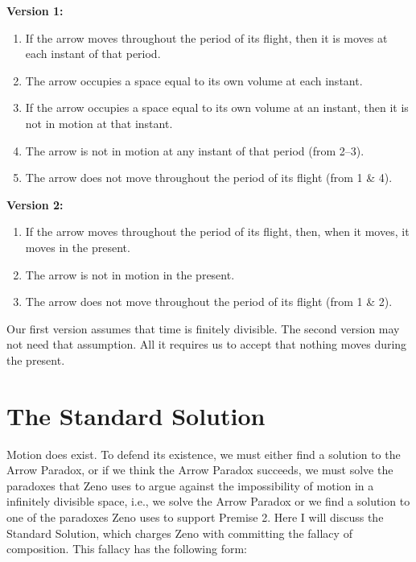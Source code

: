\documentclass[oneside]{article}
\begin{document}
\noindent \textbf{Version 1:}\begin{enumerate}
\item If the arrow moves throughout the period of its flight, then it is moves at each instant of that period. 
\item The arrow occupies a space equal to its own volume at each instant. 
\item If the arrow occupies a space equal to its own volume at an instant, then it is not in motion at that instant. 
\item The arrow is not in motion at any instant of that period (from 2--3).
\item The arrow does not move throughout the period of its flight (from 1 \& 4).\\
\end{enumerate}


\noindent \textbf{Version 2:}

\begin{enumerate}
\item If the arrow moves throughout the period of its flight, then, when it moves, it moves in the present. 
\item The arrow is not in motion in the present. 
\item The arrow does not move throughout the period of its flight (from 1 \& 2). 
\end{enumerate}
Our first version assumes that time is finitely divisible. The second version may not need that assumption. All it requires us to accept that nothing moves during the present. 

 \section*{The Standard Solution}
Motion does exist. To defend its existence, we must either find a solution to the Arrow Paradox, or if we think the Arrow Paradox succeeds, we must solve the paradoxes that Zeno uses to argue against the impossibility of motion in a infinitely divisible space, i.e., we solve the Arrow Paradox or we find a solution to one of the paradoxes Zeno uses to support Premise 2. Here I will discuss the Standard Solution, which charges Zeno with committing the fallacy of composition. This fallacy has the following form: 
\end{document}
